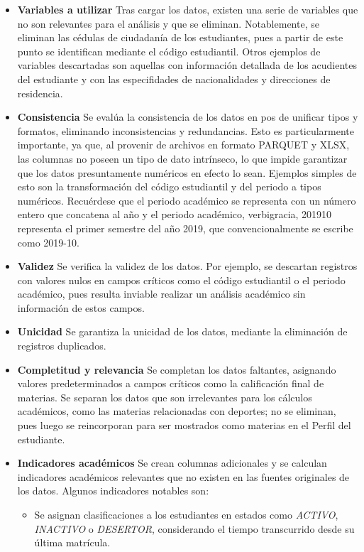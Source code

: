 \begin{itemize}
	\item \textbf{Variables a utilizar} Tras cargar los datos, existen una serie de variables que no son relevantes para el análisis y que se eliminan. Notablemente, se eliminan las cédulas de ciudadanía de los estudiantes, pues a partir de este punto se identifican mediante el código estudiantil. Otros ejemplos de variables descartadas son aquellas con información detallada de los acudientes del estudiante y con las especifidades de nacionalidades y direcciones de residencia.
	\item \textbf{Consistencia} Se evalúa la consistencia de los datos en pos de unificar tipos y formatos, eliminando inconsistencias y redundancias. Esto es particularmente importante, ya que, al provenir de archivos en formato PARQUET y XLSX, las columnas no poseen un tipo de dato intrínseco, lo que impide garantizar que los datos presuntamente numéricos en efecto lo sean. Ejemplos simples de esto son la transformación del código estudiantil y del periodo a tipos numéricos. Recuérdese que el periodo académico se representa con un número entero que concatena al año y el periodo académico, verbigracia, 201910 representa el primer semestre del año 2019, que convencionalmente se escribe como 2019-10.
	\item \textbf{Validez} Se verifica la validez de los datos. Por ejemplo, se descartan registros con valores nulos en campos críticos como el código estudiantil o el periodo académico, pues resulta inviable realizar un análisis académico sin información de estos campos.
	\item \textbf{Unicidad} Se garantiza la unicidad de los datos, mediante la eliminación de registros duplicados.
	\item \textbf{Completitud y relevancia} Se completan los datos faltantes, asignando valores predeterminados a campos críticos como la calificación final de materias. Se separan los datos que son irrelevantes para los cálculos académicos, como las materias relacionadas con deportes; no se eliminan, pues luego se reincorporan para ser mostrados como materias en el Perfil del estudiante.
	\item \textbf{Indicadores académicos} Se crean columnas adicionales y se calculan indicadores académicos relevantes que no existen en las fuentes originales de los datos. Algunos indicadores notables son:
	      \begin{itemize}
		      \item Se asignan clasificaciones a los estudiantes en estados como \textit{ACTIVO}, \textit{INACTIVO} o \textit{DESERTOR}, considerando el tiempo transcurrido desde su última matrícula.

\end{itemize}
\end{itemize}
